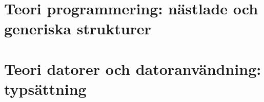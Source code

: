 


\clearpage\section{Teori programmering: nästlade och generiska strukturer}




\clearpage\section{Teori datorer och datoranvändning: typsättning}

